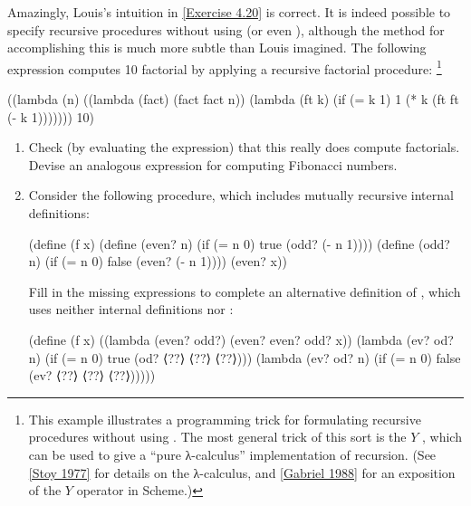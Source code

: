 \begin{exercise}
	\label{Exercise 4.21}
	Amazingly, Louis’s intuition in \cref{Exercise 4.20} is correct.
	It is indeed possible to specify recursive procedures without using  (or even ), although the method for accomplishing this is much more subtle than Louis imagined.
	The following expression computes 10 factorial by applying a recursive factorial procedure:%
	\footnote{
		This example illustrates a programming trick for formulating recursive procedures without using .
		The most general trick of this sort is the \( Y \) , which can be used to give a “pure λ-calculus” implementation of recursion.
		(See \cref{Stoy 1977} for details on the λ-calculus, and \cref{Gabriel 1988} for an exposition of the \( Y \) operator in Scheme.)
	}
	\begin{scheme}
	  ((lambda (n)
	     ((lambda (fact) (fact fact n))
	      (lambda (ft k) (if (= k 1) 1 (* k (ft ft (- k 1)))))))
	   10)
	\end{scheme}
	\begin{enumerate}[label = \alph*., leftmargin = *]

		\item
			Check (by evaluating the expression) that this really does compute factorials.
			Devise an analogous expression for computing Fibonacci numbers.

		\item
			Consider the following procedure, which includes mutually recursive internal definitions:
			\begin{scheme}
			  (define (f x)
			    (define (even? n)
			      (if (= n 0) true  (odd?  (- n 1))))
			    (define (odd? n)
			      (if (= n 0) false (even? (- n 1))))
			    (even? x))
			\end{scheme}
			Fill in the missing expressions to complete an alternative definition of , which uses neither internal definitions nor :
			\begin{scheme}
			  (define (f x)
			    ((lambda (even? odd?) (even? even? odd? x))
			     (lambda (ev? od? n)
			       (if (= n 0) true (od? ⟨??⟩ ⟨??⟩ ⟨??⟩)))
			     (lambda (ev? od? n)
			       (if (= n 0) false (ev? ⟨??⟩ ⟨??⟩ ⟨??⟩)))))
			\end{scheme}

	\end{enumerate}
\end{exercise}

